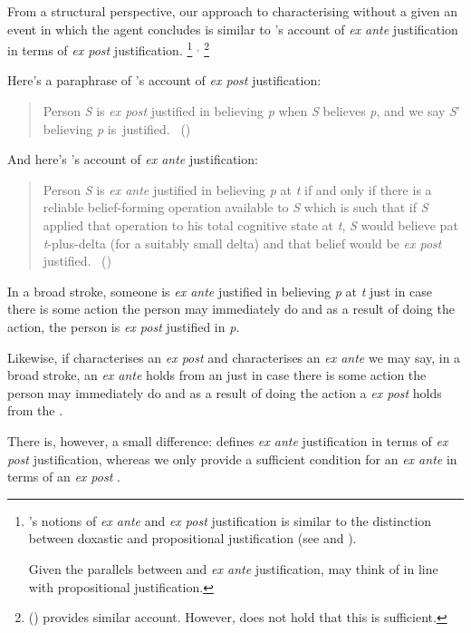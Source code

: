 \begin{note}
  From a structural perspective, our approach to characterising  without a given an event in which the agent concludes is similar to \citeauthor{Goldman:1979ui}'s account of \emph{ex ante} justification in terms of \emph{ex post} justification.%
  \footnote{
    \citeauthor{Goldman:1979ui}'s notions of \emph{ex ante} and \emph{ex post} justification is similar to the distinction between doxastic and propositional justification (see \cite{Firth:1978vi} and \cite[esp.\ fn.1]{Silva:2020aa}).

    Given the parallels between  and \emph{ex ante} justification, may think of  in line with propositional justification.
  }%
  \(^{,}\)%
  \footnote{
    \citeauthor{Turri:2010aa} (\citeyear{Turri:2010aa}) provides similar account.
    However, \citeauthor{Turri:2010aa} does not hold that this is sufficient.
  }

  Here's a paraphrase of \citeauthor{Goldman:1979ui}'s account of \emph{ex post} justification:
  \begin{quote}
    Person \emph{S} is \emph{ex post} justified in believing \emph{p} when \emph{S} believes \emph{p}, and we say \emph{S}' believing \emph{p} is~justified.%
    \mbox{ }\hfill\mbox{(\citeyear[Cf.][21]{Goldman:1979ui})}
  \end{quote}
  And here's \citeauthor{Goldman:1979ui}'s account of \emph{ex ante} justification:
  \begin{quote}
    Person \emph{S} is \emph{ex ante} justified in believing \emph{p} at \emph{t} if and only if there is a reliable belief-forming operation available to \emph{S} which is such that if \emph{S} applied that operation to his total cognitive state at \emph{t}, \emph{S} would believe pat \emph{t}-plus-delta (for a suitably small delta) and that belief would be \emph{ex post} justified.%
    \mbox{ }\hfill\mbox{(\citeyear[21]{Goldman:1979ui})}
  \end{quote}
  In a broad stroke, someone is \emph{ex ante} justified in believing \emph{p} at \emph{t} just in case there is some action the person may immediately do and as a result of doing the action, the person is \emph{ex post} justified in \emph{p}.

  Likewise, if \support{} characterises an \emph{ex post}  and \supportII{} characterises an \emph{ex ante}  we may say, in a broad stroke, an \emph{ex ante} \ros{} holds from an \agpe{} just in case there is some action the person may immediately do and as a result of doing the action a \emph{ex post} \ros{} holds from the \agpe{}.

  There is, however, a small difference:
  \citeauthor{Goldman:1979ui} defines \emph{ex ante} justification in terms of \emph{ex post} justification, whereas we only provide a sufficient condition for an \emph{ex ante} \ros{} in terms of an \emph{ex post} \ros{}.
\end{note}

